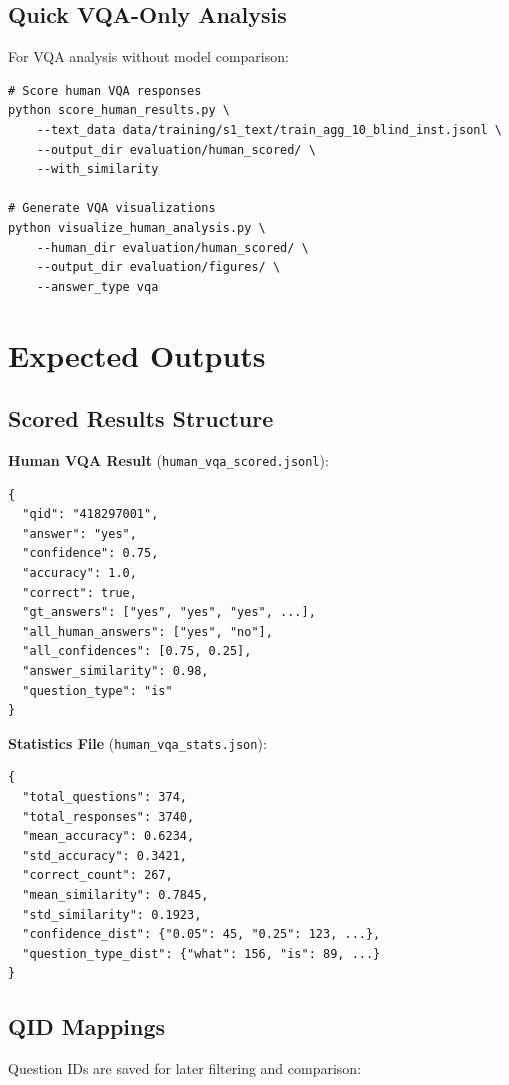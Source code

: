 \documentclass{article}
\begin{document}
\subsection{Quick VQA-Only Analysis}

For VQA analysis without model comparison:

\begin{verbatim}
# Score human VQA responses
python score_human_results.py \
    --text_data data/training/s1_text/train_agg_10_blind_inst.jsonl \
    --output_dir evaluation/human_scored/ \
    --with_similarity

# Generate VQA visualizations
python visualize_human_analysis.py \
    --human_dir evaluation/human_scored/ \
    --output_dir evaluation/figures/ \
    --answer_type vqa
\end{verbatim}

\section{Expected Outputs}

\subsection{Scored Results Structure}

\textbf{Human VQA Result} (\texttt{human\_vqa\_scored.jsonl}):
\begin{verbatim}
{
  "qid": "418297001",
  "answer": "yes",
  "confidence": 0.75,
  "accuracy": 1.0,
  "correct": true,
  "gt_answers": ["yes", "yes", "yes", ...],
  "all_human_answers": ["yes", "no"],
  "all_confidences": [0.75, 0.25],
  "answer_similarity": 0.98,
  "question_type": "is"
}
\end{verbatim}

\textbf{Statistics File} (\texttt{human\_vqa\_stats.json}):
\begin{verbatim}
{
  "total_questions": 374,
  "total_responses": 3740,
  "mean_accuracy": 0.6234,
  "std_accuracy": 0.3421,
  "correct_count": 267,
  "mean_similarity": 0.7845,
  "std_similarity": 0.1923,
  "confidence_dist": {"0.05": 45, "0.25": 123, ...},
  "question_type_dist": {"what": 156, "is": 89, ...}
}
\end{verbatim}

\subsection{QID Mappings}

Question IDs are saved for later filtering and comparison:
\end{document}
